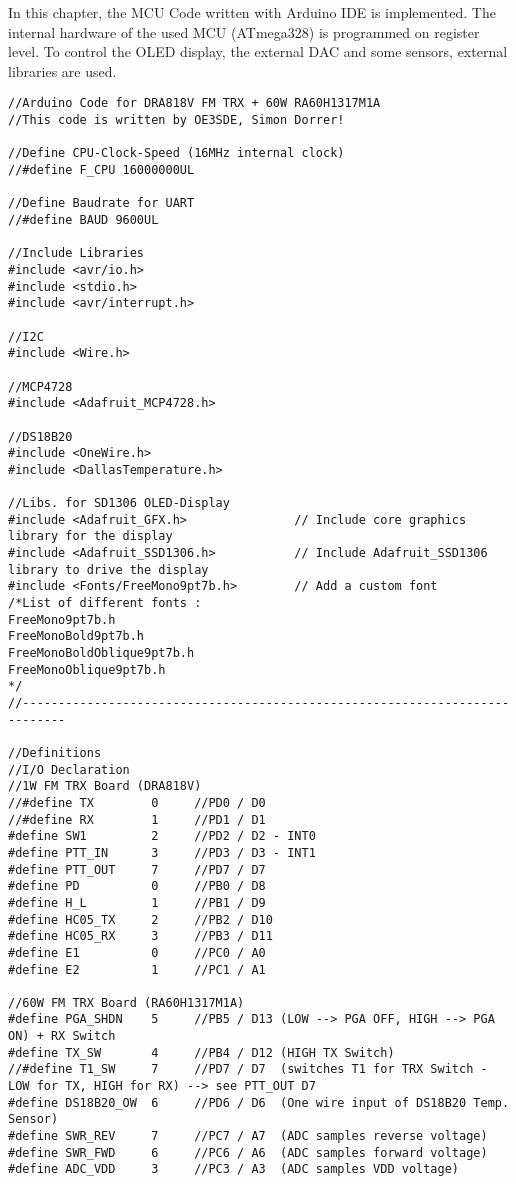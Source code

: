 In this chapter, the MCU Code written with Arduino IDE is implemented. 
The internal hardware of the used MCU (ATmega328) is programmed on register level.
To control the OLED display, the external DAC and some sensors, external libraries are used.

\begin{lstlisting}[language=Arduino]
//Arduino Code for DRA818V FM TRX + 60W RA60H1317M1A
//This code is written by OE3SDE, Simon Dorrer!

//Define CPU-Clock-Speed (16MHz internal clock)
//#define F_CPU 16000000UL

//Define Baudrate for UART
//#define BAUD 9600UL

//Include Libraries
#include <avr/io.h>
#include <stdio.h>
#include <avr/interrupt.h>

//I2C
#include <Wire.h>

//MCP4728
#include <Adafruit_MCP4728.h>

//DS18B20
#include <OneWire.h> 
#include <DallasTemperature.h>

//Libs. for SD1306 OLED-Display
#include <Adafruit_GFX.h>               // Include core graphics library for the display
#include <Adafruit_SSD1306.h>           // Include Adafruit_SSD1306 library to drive the display
#include <Fonts/FreeMono9pt7b.h>        // Add a custom font
/*List of different fonts :
FreeMono9pt7b.h
FreeMonoBold9pt7b.h
FreeMonoBoldOblique9pt7b.h
FreeMonoOblique9pt7b.h  
*/
//----------------------------------------------------------------------------

//Definitions
//I/O Declaration
//1W FM TRX Board (DRA818V)
//#define TX        0     //PD0 / D0
//#define RX        1     //PD1 / D1
#define SW1         2     //PD2 / D2 - INT0
#define PTT_IN      3     //PD3 / D3 - INT1
#define PTT_OUT     7     //PD7 / D7
#define PD          0     //PB0 / D8
#define H_L         1     //PB1 / D9
#define HC05_TX     2     //PB2 / D10
#define HC05_RX     3     //PB3 / D11
#define E1          0     //PC0 / A0
#define E2          1     //PC1 / A1

//60W FM TRX Board (RA60H1317M1A)
#define PGA_SHDN    5     //PB5 / D13 (LOW --> PGA OFF, HIGH --> PGA ON) + RX Switch
#define TX_SW       4     //PB4 / D12 (HIGH TX Switch)
//#define T1_SW     7     //PD7 / D7  (switches T1 for TRX Switch - LOW for TX, HIGH for RX) --> see PTT_OUT D7
#define DS18B20_OW  6     //PD6 / D6  (One wire input of DS18B20 Temp. Sensor)
#define SWR_REV     7     //PC7 / A7  (ADC samples reverse voltage)
#define SWR_FWD     6     //PC6 / A6  (ADC samples forward voltage)
#define ADC_VDD     3     //PC3 / A3  (ADC samples VDD voltage) 


\end{lstlisting}
